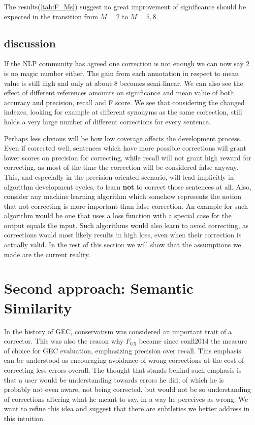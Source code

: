 \documentclass[english]{article}
\begin{document}
The results(\ref{tab:F_Ms}) suggest no great improvement of significance should be expected in the transition from $M=2$ to $M=5,8$.

\subsection{discussion}

If the NLP community has agreed one correction is not enough\cite{tetreault2008native}
we can now say 2 is no magic number either. The gain from each annotation in respect to mean value is still high and only at about 8 becomes semi-linear. We can also see the effect of different references amounts on significance and mean value of both accuracy and precision, recall and F score.
We see that considering the changed indexes, looking for example at different synonyms as the same correction, still holds a very large number of different corrections for every sentence.


Perhaps less obvious will be how low coverage affects the development
process. Even if corrected well, sentences which have more possible
corrections will grant lower scores on precision for correcting, while recall will not grant high reward for correcting, as most of the time the correction will be considered false anyway. This, and especially in the precision oriented scenario, will lead implicitly in algorithm development cycles, to learn \textbf{not} to correct those sentences at all. Also, consider any machine learning algorithm which somehow represents the notion that not correcting is more important than false correction. An example for such algorithm would be one that uses a loss function with a special case for the output equals the input. Such algorithms would also learn to avoid correcting, as corrections would most likely results in high loss, even when their correction is actually valid.
In the rest of this section we will show that the assumptions we made are the current reality. 


\section{Second approach: Semantic Similarity\label{sec:Semantics}}

In the history of GEC, conservatism was considered an
important trait of a corrector\cite{brockett2006correcting}.
This was also the reason why $F_{0.5}$ became since conll2014\cite{ng2014conll}
the measure of choice for GEC evaluation, emphasizing
precision over recall. This emphasis can be understood as encouraging
avoidance of wrong corrections at the cost of correcting less errors
overall. The thought that stands behind such emphasis is that a user
would be understanding towards errors he did, of which he is probably
not even aware, not being corrected, but would not be so understanding
of corrections altering what he meant to say, in a way he perceives as wrong. We want to refine
this idea and suggest that there are subtleties we better address
in this intuition.
\end{document}
